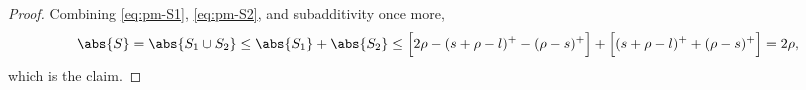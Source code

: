 \begin{proof}
  Combining \eqref{eq:pm-S1}, \eqref{eq:pm-S2}, and subadditivity once more,
  \[
    \abs{S} = \abs{S_1 \cup S_2} \leq \abs{S_1} + \abs{S_2}
    \leq \Bigl[2\rho - (s+\rho-l)^+ - (\rho-s)^+\Bigr] + \Bigl[(s+\rho-l)^+ + (\rho-s)^+\Bigr]
    = 2\rho
    ,
  \]
  which is the claim. \qedhere
\end{proof}
